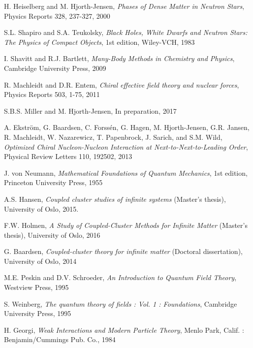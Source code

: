 \documentclass[10pt,twoside]{report}
\begin{document}
	
	\begin{thebibliography}{9}
		
		H. Heiselberg and M. Hjorth-Jensen, \emph{Phases of Dense Matter in Neutron Stars}, Physics Reports 328, 237-327, 2000
		
		S.L. Shapiro and S.A. Teukolsky, \emph{
			Black Holes, White Dwarfs and Neutron Stars: The Physics of Compact Objects}, 1st edition, Wiley-VCH, 1983
		
		I. Shavitt and R.J. Bartlett,
		\emph{Many-Body Methods in Chemistry and Physics}, Cambridge University Press, 2009
		
		R. Machleidt and D.R. Entem, \emph{Chiral effective field theory and nuclear forces}, Physics Reports 503, 1-75, 2011
		
		S.B.S. Miller and M. Hjorth-Jensen, In preparation, 2017
		
		A. Ekstr\"om, G. Baardsen, C. Forss\'{e}n, G. Hagen, M. Hjorth-Jensen, G.R. Jansen, R. Machleidt, W. Nazarewicz, T. Papenbrock, J. Sarich, and S.M. Wild, \emph{Optimized Chiral Nucleon-Nucleon Interaction at Next-to-Next-to-Leading Order}, Physical Review Letters 110, 192502, 2013
		
		J. von Neumann, \emph{Mathematical Foundations of Quantum Mechanics}, 1st edition, Princeton University Press, 1955
		
		A.S. Hansen,
		\emph{Coupled cluster studies of infinite systems} (Master's thesis), University of Oslo, 2015.
		
		F.W. Holmen,
		\emph{A Study of Coupled-Cluster Methods for Infinite Matter} (Master's thesis), University of Oslo, 2016
		
		G. Baardsen, \emph{Coupled-cluster theory for infinite matter}  (Doctoral dissertation), University of Oslo, 2014
		
		M.E. Peskin and D.V. Schroeder, \emph{An Introduction to Quantum Field Theory}, Westview Press, 1995
		
		S. Weinberg, \emph{The quantum theory of fields : Vol. 1 : Foundations}, Cambridge University Press, 1995
		
		H. Georgi, \emph{Weak Interactions and Modern Particle Theory}, Menlo Park, Calif. : Benjamin/Cummings Pub. Co., 1984
		

\end{thebibliography}
\end{document}

